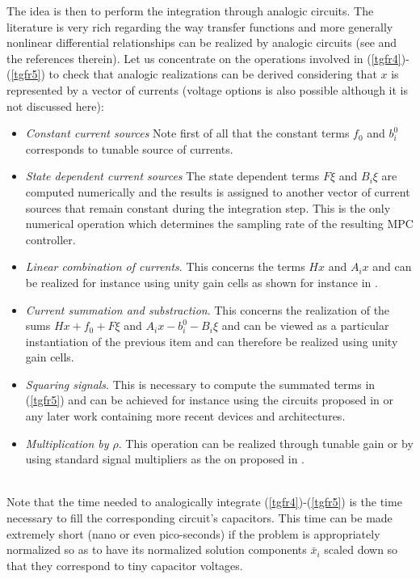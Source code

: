 \documentclass{article}
\begin{document}
The idea is then to perform the integration through analogic circuits. The literature is very rich regarding the way transfer functions and more generally nonlinear differential relationships can be realized by analogic circuits (see \cite{Papazoglou:1997,Gunes:1997} and the references therein). Let us concentrate on the operations involved in (\ref{tgfr4})-(\ref{tgfr5}) to check that analogic realizations can be derived considering that $x$ is represented by a vector of currents (voltage options is also possible \cite{Yuanmao:2012}  although it is not discussed here):
\begin{itemize}
\item {\em Constant current sources} Note first of all that the constant terms $f_0$ and $b_i^0$  corresponds to tunable source of currents.
\item {\em State dependent current sources} The state dependent terms $F\xi$ and $B_i\xi$ are computed numerically and the results is assigned to another vector of current sources that remain constant during the integration step. This is the only numerical operation which determines the sampling rate of the resulting MPC controller.
\item {\em Linear combination of currents}. This concerns the terms $Hx$ and $A_ix$ and can be realized for instance using unity gain cells as shown for instance in \cite{Gunes:1997}.
\item {\em Current summation and substraction}. This concerns the realization of the sums $Hx+f_0+F\xi$ and $A_ix-b_i^0-B_i\xi$  and can be viewed as a particular instantiation of the previous item and can therefore be realized using unity gain cells. 
\item {\em Squaring signals}. This is necessary to compute the summated terms in (\ref{tgfr5}) and can be achieved for instance using the circuits proposed in \cite{Filanovski:1992,Hidayat:2008} or any later work containing more recent devices and architectures.
\item {\em Multiplication by $\rho$}. This operation can be realized through tunable gain or by using standard signal multipliers as the on proposed in \cite{Hidayat:2008}.   
\end{itemize} 
\ \\
Note that the time needed to analogically integrate (\ref{tgfr4})-(\ref{tgfr5}) is the time necessary to fill the corresponding circuit's capacitors. This time can be made extremely short (nano or even pico-seconds) if the problem is appropriately normalized so as to have its normalized solution components $\bar x_i$ scaled down so that they correspond to tiny capacitor voltages. \ \\ \ \\ 
\end{document}
